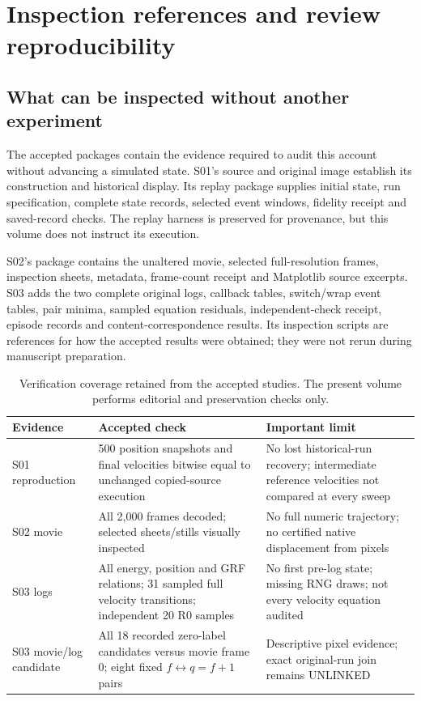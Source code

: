 \chapter{Inspection references and review reproducibility}\label{app:repro}
\section{What can be inspected without another experiment}
The accepted packages contain the evidence required to audit this
account without advancing a simulated state. S01's source and original
image establish its construction and historical display. Its replay
package supplies initial state, run specification, complete state
records, selected event windows, fidelity receipt and saved-record
checks. The replay harness is preserved for provenance, but this
volume does not instruct its execution.

S02's package contains the unaltered movie, selected full-resolution
frames, inspection sheets, metadata, frame-count receipt and
Matplotlib source excerpts. S03 adds the two complete original
logs, callback tables, switch/wrap event tables, pair minima,
sampled equation residuals, independent-check receipt, episode
records and content-correspondence results. Its inspection
scripts are references for how the accepted results were obtained;
they were not rerun during manuscript preparation.

\begin{table}[htbp]\centering\small
\caption{Verification coverage retained from the accepted studies.
The present volume performs editorial and preservation checks only.}
\label{tab:verification}
\begin{tabularx}{\linewidth}{@{}l Y Y@{}}\toprule
Evidence & Accepted check & Important limit\\\midrule
S01 reproduction &500 position snapshots and final velocities bitwise
equal to unchanged copied-source execution &No lost historical-run recovery;
intermediate reference velocities not compared at every sweep\\
S02 movie &All 2,000 frames decoded; selected sheets/stills visually inspected
&No full numeric trajectory; no certified native displacement from pixels\\
S03 logs &All energy, position and GRF relations; 31 sampled full velocity
transitions; independent 20 R0 samples &No first pre-log state; missing RNG draws;
not every velocity equation audited\\
S03 movie/log candidate &All 18 recorded zero-label candidates versus movie frame 0;
eight fixed $f\leftrightarrow q=f+1$ pairs &Descriptive pixel evidence;
exact original-run join remains UNLINKED\\\bottomrule
\end{tabularx}
\end{table}

